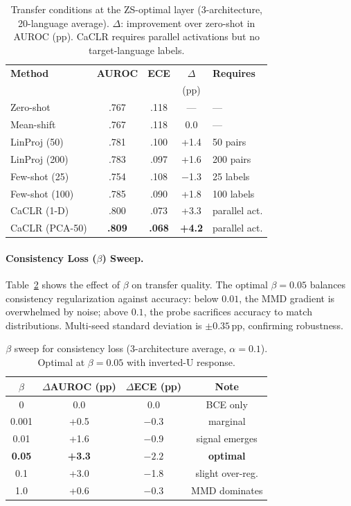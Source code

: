 \documentclass[11pt,a4paper]{article}
\newcommand{\pp}{\,\text{pp}}
\newcommand{\caclr}{CaCLR}
\begin{document}
\begin{table}[t]
\centering
\small
\begin{tabular}{@{}lcccl@{}}
\toprule
\textbf{Method} & \textbf{AUROC} & \textbf{ECE} & \textbf{$\Delta$} & \textbf{Requires} \\
 & & & (pp) & \\
\midrule
Zero-shot & .767 & .118 & --- & --- \\
Mean-shift & .767 & .118 & 0.0 & --- \\
LinProj (50) & .781 & .100 & +1.4 & 50 pairs \\
LinProj (200) & .783 & .097 & +1.6 & 200 pairs \\
Few-shot (25) & .754 & .108 & $-$1.3 & 25 labels \\
Few-shot (100) & .785 & .090 & +1.8 & 100 labels \\
\caclr{} (1-D) & .800 & .073 & +3.3 & parallel act. \\
\caclr{} (PCA-50) & \textbf{.809} & \textbf{.068} & \textbf{+4.2} & parallel act. \\
\bottomrule
\end{tabular}
\caption{Transfer conditions at the ZS-optimal layer (3-architecture, 20-language average). $\Delta$: improvement over zero-shot in AUROC (pp). \caclr{} requires parallel activations but no target-language labels.}
\label{tab:transfer}
\end{table}

\paragraph{Consistency Loss ($\beta$) Sweep.}
Table~\ref{tab:beta} shows the effect of $\beta$ on transfer quality.
The optimal $\beta{=}0.05$ balances consistency regularization against accuracy: below $0.01$, the MMD gradient is overwhelmed by noise; above $0.1$, the probe sacrifices accuracy to match distributions.
Multi-seed standard deviation is ${\pm}0.35\pp$, confirming robustness.

\begin{table}[t]
\centering
\small
\begin{tabular}{@{}cccc@{}}
\toprule
$\beta$ & $\Delta$AUROC (pp) & $\Delta$ECE (pp) & Note \\
\midrule
0 & 0.0 & 0.0 & BCE only \\
0.001 & +0.5 & $-$0.3 & marginal \\
0.01 & +1.6 & $-$0.9 & signal emerges \\
\textbf{0.05} & \textbf{+3.3} & $\mathbf{-2.2}$ & \textbf{optimal} \\
0.1 & +3.0 & $-$1.8 & slight over-reg. \\
1.0 & +0.6 & $-$0.3 & MMD dominates \\
\bottomrule
\end{tabular}
\caption{$\beta$ sweep for consistency loss (3-architecture average, $\alpha{=}0.1$). Optimal at $\beta{=}0.05$ with inverted-U response.}
\label{tab:beta}
\end{table}
\end{document}
